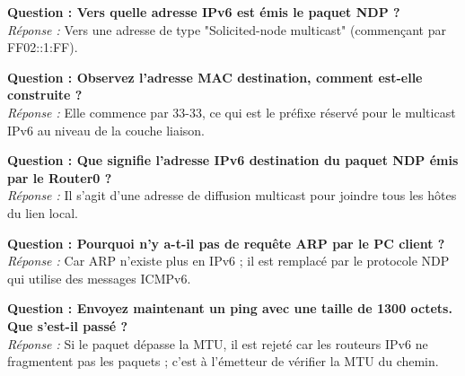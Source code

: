 \documentclass[a4paper,12pt]{article}
\begin{document}
\textbf{Question : Vers quelle adresse IPv6 est émis le paquet NDP ?} \\
\textit{Réponse :} Vers une adresse de type "Solicited-node multicast" (commençant par FF02::1:FF).
\vspace{1em}

\textbf{Question : Observez l'adresse MAC destination, comment est-elle construite ?} \\
\textit{Réponse :} Elle commence par 33-33, ce qui est le préfixe réservé pour le multicast IPv6 au niveau de la couche liaison.
\vspace{1em}

\textbf{Question : Que signifie l'adresse IPv6 destination du paquet NDP émis par le Router0 ?} \\
\textit{Réponse :} Il s'agit d'une adresse de diffusion multicast pour joindre tous les hôtes du lien local.
\vspace{1em}

\textbf{Question : Pourquoi n'y a-t-il pas de requête ARP par le PC client ?} \\
\textit{Réponse :} Car ARP n'existe plus en IPv6 ; il est remplacé par le protocole NDP qui utilise des messages ICMPv6.
\vspace{1em}

\textbf{Question : Envoyez maintenant un ping avec une taille de 1300 octets. Que s'est-il passé ?} \\
\textit{Réponse :} Si le paquet dépasse la MTU, il est rejeté car les routeurs IPv6 ne fragmentent pas les paquets ; c'est à l'émetteur de vérifier la MTU du chemin.
\vspace{1em}
\end{document}
